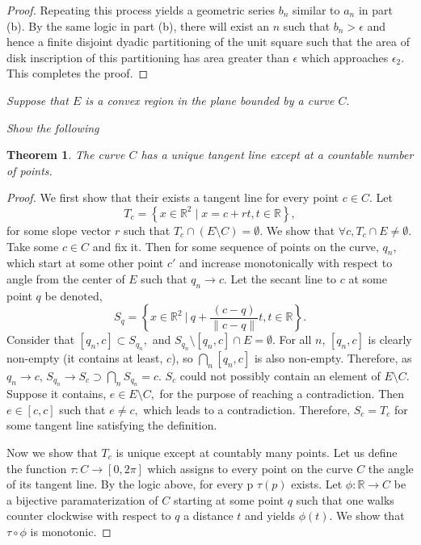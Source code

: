 \documentclass[letter]{article}
\newtheorem{theorem}{Theorem}
\newenvironment{menumerate}{%
  \edef\backupindent{\the\parindent}%
  \enumerate%
  \setlength{\parindent}{\backupindent}%
}{\endenumerate}
\begin{document}
\begin{menumerate}
\begin{menumerate}
\begin{proof}
					Repeating this process yields a geometric series $b_n$ similar to $a_n$ in part (b). By the same logic in part (b), there will exist an $n$ such that $b_n> \epsilon$ and hence a finite disjoint dyadic partitioning of the unit square such that the area of disk inscription of this partitioning has area greater than $\epsilon$ which approaches $\epsilon_2$. This completes the proof. 
				\end{proof}
			\end{menumerate}

		\setcounter{enumi}{31}
		\item \textit{Suppose that $E$ is a convex region in the plane bounded by a curve $C.$}
			\begin{menumerate}
				\item \textit{Show the following}
					\begin{theorem}
						The curve $C$ has a unique tangent line except at a countable number of points.
					\end{theorem}

					\begin{proof}
						We first show that their exists a tangent line for every point $c\in C.$ Let $$T_c = \left\{x\in\mathbb{R}^2\;|\;x=c+rt, t \in \mathbb{R}\right\}, $$ for some slope vector $r$ such that $T_c \cap (E\setminus C) = \emptyset.$ We show that $\forall c, T_c \cap E \neq \emptyset.$ 
						Take some $c \in C$ and fix it. Then for some sequence of points on the curve, $q_n$, which start at some other point $c'$ and increase monotonically with respect to angle from the center of $E$ such that $q_n \to c.$ Let the secant line to $c$ at some point $q$ be denoted, $$S_q = \left\{x \in \mathbb{R}^2\ |\ q + \frac{(c-q)}{\|c-q\|}t, t\in \mathbb{R}\right\}.$$
						Consider that $[q_n,c] \subset S_{q_n},$ and $ S_{q_n} \setminus {[q_n,c]} \cap E =\emptyset.$ For all $n$, $[q_n,c]$ is clearly non-empty (it contains at least, $c$), so $\bigcap_n[q_n,c]$ is also non-empty. Therefore, as $q_n \to c$, $S_{q_n} \to S_{c} \supset \bigcap_n S_{q_n} = {c}$. $S_c$ could not possibly contain an element of $E \setminus C.$ Suppose it contains, $e \in E \setminus C,$ for the purpose of reaching a contradiction. Then $e \in [c,c]$ such that $e\neq c,$ which leads to a contradiction. Therefore, $S_c = T_c$ for some tangent line satisfying the definition.

						Now we show that $T_c$ is unique except at countably many points. Let us define the function $\tau : C \to [0,2\pi]$ which assigns to every point on the curve $C$ the angle of its tangent line. By the logic above, for every p $\tau(p)$ exists. Let $\phi:\mathbb{R}\to C$ be a bijective paramaterization of $C$ starting at some point $q$ such that one walks counter clockwise with respect to $q$ a distance $t$ and yields $\phi(t).$ We show that $\tau \circ \phi$ is monotonic. 
					\end{proof} 
			\end{menumerate} 

		
		
\end{menumerate}
\end{document}
